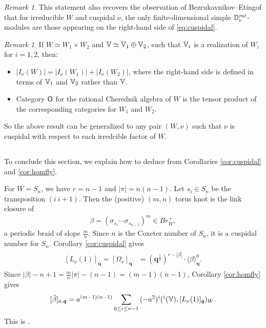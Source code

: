 \documentclass[a4paper,10pt,leqno]{amsart}
\theoremstyle{plain}
\theoremstyle{plain}
\theoremstyle{plain}
\theoremstyle{definition}
\theoremstyle{remark}
\newtheorem{rem}[thm]{Remark}
\let\Alt\relax
\DeclareMathOperator{\Alt}{\text{$\Lambda$}}
\newcommand{\Br}{\mathit{Br}}
\newcommand{\Q}{\bm{q}}
\newcommand{\Tr}[1]{\langle{#1}\rangle_{\Q}}
\newcommand{\rat}{\mathit{rat}}
\newcommand{\slope}{\nu}
\begin{document}
\begin{rem}
This statement also recovers the observation of Bezrukavnikov--Etingof \cite[Rem.\ 3.31]{be} that for irreducible $W$ and cuspidal $\slope$, the only finite-dimensional simple $\bb{D}_\slope^\rat$-modules are those appearing on the right-hand side of \eqref{eq:cuspidal}.
\end{rem}

\begin{rem}
If $W \simeq W_1 \times W_2$ and $\bb{V} \simeq \bb{V}_1 \oplus \bb{V}_2$, such that $\bb{V}_i$ is a realization of $W_i$ for $i = 1, 2$, then:
\begin{itemize}
\item 	$|I_\slope(W)| = |I_\slope(W_1)| + |I_\slope(W_2)|$, where the right-hand side is defined in terms of $\bb{V}_1$ and $\bb{V}_2$ rather than $\bb{V}$.
\item 	Category $\sf{O}$ for the rational Cherednik algebra of $W$ is the tensor product of the corresponding categories for $W_1$ and $W_2$.
\end{itemize}
So the above result can be generalized to any pair $(W, \slope)$ such that $\slope$ is cuspidal with respect to each irredcible factor of $W$.
\end{rem}

\subsection{}

To conclude this section, we explain how to deduce \cite[Thm.\ 1.1]{gors} from Corollaries \ref{cor:cuspidal} and \ref{cor:homfly}.

For $W = S_n$, we have $r = n - 1$ and $|\pi| = n(n - 1)$.
Let $s_i \in S_n$ be the transposition $(i~i + 1)$.
Then the (positive) $(m, n)$ torus knot is the link closure of 
\begin{align}
\beta = (\sigma_{s_1} \cdots \sigma_{s_{n - 1}})^m \in \Br_W^+,
\end{align}
a periodic braid of slope $\frac{m}{n}$.
Since $n$ is the Coxeter number of $S_n$, it is a cuspidal number for $S_n$.
Corollary \ref{cor:cuspidal} gives
\begin{align}\begin{split}
{[L_\slope(1)]_{\Q}}
	= {[\Omega_\slope]_{\Q}}
	&= (\Q^{\frac{1}{2}})^{r - |\beta|} \cdot \Tr{\beta}^0.
\end{split}\end{align}
Since $|\beta| - n + 1 = \frac{m}{n}|\pi| - (n - 1) = (m - 1)(n - 1)$, Corollary \ref{cor:homfly} gives
\begin{align}
{[\hat{\beta}]_{a, \Q}}
=	a^{(m - 1)(n - 1)}
	\sum_{0 \leq i \leq n - 1}
	{(-a^2)^i}
	(\Alt^i(\bb{V}), {[L_\slope(1)]_{\Q}})_W.
\end{align}
This is \cite[Thm.\ 1.1]{gors}.
\end{document}
